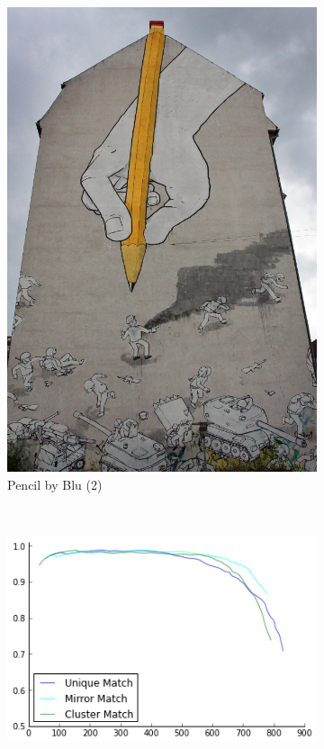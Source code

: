 \documentclass{article}
\begin{document}
\begin{figure}
{\begin{subfigure}[t]{0.25\textwidth}
			\includegraphics[width=\textwidth]{images/blu_pencil_2}
			\caption{Pencil by Blu (2)}
			\label{fig:pencil2}
		\end{subfigure}%
		~ %
		\begin{subfigure}[t]{0.55\textwidth}
			\centering
			\includegraphics[width=\textwidth]{images/result_blu_pencil}

\end{subfigure}}
\end{figure}
\end{document}
